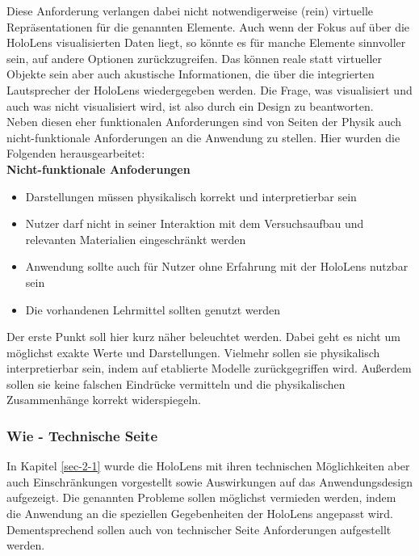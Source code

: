Diese Anforderung verlangen dabei nicht notwendigerweise (rein) virtuelle Repräsentationen für die genannten Elemente. Auch wenn der Fokus auf über die HoloLens visualisierten Daten liegt, so könnte es für manche Elemente sinnvoller sein, auf andere Optionen zurückzugreifen. Das können reale statt virtueller Objekte sein aber auch akustische Informationen, die über die integrierten Lautsprecher der HoloLens wiedergegeben werden. Die Frage, was visualisiert und auch was nicht visualisiert wird, ist also durch ein Design zu beantworten.\\

Neben diesen eher funktionalen Anforderungen sind von Seiten der Physik auch nicht-funktionale Anforderungen an die Anwendung zu stellen. Hier wurden die Folgenden herausgearbeitet:\\[4px]
\textbf{Nicht-funktionale Anfoderungen}
\begin{itemize}[topsep=-2px]
	\setlength{\itemsep}{-1pt}
	\singlespacing
	\item Darstellungen müssen physikalisch korrekt und interpretierbar sein
	\item Nutzer darf nicht in seiner Interaktion mit dem Versuchsaufbau und relevanten Materialien eingeschränkt werden
	\item Anwendung sollte auch für Nutzer ohne Erfahrung mit der HoloLens nutzbar sein
	\item Die vorhandenen Lehrmittel sollten genutzt werden
\end{itemize}
\vspace{6px}
Der erste Punkt soll hier kurz näher beleuchtet werden. Dabei geht es nicht um möglichst exakte Werte und Darstellungen. Vielmehr sollen sie physikalisch interpretierbar sein, indem auf etablierte Modelle zurückgegriffen wird. Außerdem sollen sie keine falschen Eindrücke vermitteln und die physikalischen Zusammenhänge korrekt widerspiegeln.\\

\subsubsection{Wie - Technische Seite}
In Kapitel \ref{sec-2-1} wurde die HoloLens mit ihren technischen Möglichkeiten aber auch Einschränkungen vorgestellt sowie Auswirkungen auf das Anwendungsdesign aufgezeigt. Die genannten Probleme sollen möglichst vermieden werden, indem die Anwendung an die speziellen Gegebenheiten der HoloLens angepasst wird. Dementsprechend sollen auch von technischer Seite Anforderungen aufgestellt werden.\\


